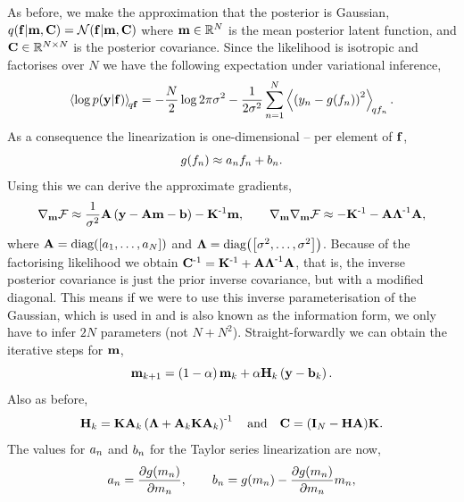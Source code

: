 \documentclass{article} %
\begin{document}
As before, we make the approximation that the posterior is Gaussian,
$\qrobC{\lstate}{\pomean, \pocov} = \gausC{\lstate}{\pomean, \pocov}$ where
$\pomean \in \real{N}$ is the mean posterior latent function, and $\pocov \in
\real{N \times N}$ is the posterior covariance. Since the likelihood is
isotropic and factorises over $N$ we have the following expectation under
variational inference,
\begin{equation*}
    \expec{q\lstate}{\log\probC{\obs}{\lstate}} =
        - \frac{N}{2}\log{2\pi\lvar}
        - \frac{1}{2\lvar} \sum_{n=1}^N 
            \expec{q\lstates_n}{\brac{\obss_n - \nonlin{\lstates_n}}^2}.
\end{equation*}
As a consequence the linearization is one-dimensional -- per element of 
$\lstate$,
\begin{equation}
    \nonlin{\lstates_n} \approx \Lins_n\lstates_n + \intcpts_n.
\end{equation}
Using this we can derive the approximate gradients,
\begin{equation}
    \nabla_\pomean\Fengy \approx \frac{1}{\lvar}\Linmat\brac{\obs -
        \Linmat\pomean - \intcpt} - \KERNL\inv\pomean,
    \qquad
    \nabla_\pomean\nabla_\pomean \Fengy \approx -\KERNL\inv
    -\Linmat\Lvar\inv\Linmat,
\end{equation}
where $\Linmat = \diag{\sbrac{\Lins_1, \ldots, \Lins_N}}$ and $\Lvar =
\diag{\sbrac{\lvar, \ldots, \lvar}}$. Because of the factorising likelihood we
obtain $\pocov\inv = \KERNL\inv + \Linmat\Lvar\inv\Linmat$, that is, the
inverse posterior covariance is just the prior inverse covariance, but with a
modified diagonal. This means if we were to use this inverse parameterisation
of the Gaussian, which is used in \cite{Opper2009} and is also known as the
information form, we only have to infer $2N$ parameters (not $N + N^2$).
Straight-forwardly we can obtain the iterative steps for $\pomean$,
\begin{equation}
    \pomean_{k+1} = \brac{1-\step}\pomean_k 
        + \step\Kgain_k\brac{\obs - \intcpt_k}.
    \label{eq:pomeangp}
\end{equation}
Also as before,
\begin{equation}
    \Kgain_k = \KERNL\Linmat_k\brac{\Lvar + \Linmat_k\KERNL\Linmat_k}\inv
    \quad \text{and} \quad
    \pocov = \brac{\ident{N} - \Kgain\Linmat}\!\KERNL.
    \label{eq:pocovgp}
\end{equation}
The values for $\Lins_n$ and $\intcpts_n$ for the Taylor series linearization
are now,
\begin{equation}
    \Lins_n = \frac{\partial\nonlin{\pomeans_n}}{\partial\pomeans_n},
    \qquad
    \intcpts_n = \nonlin{\pomeans_n}
        - \frac{\partial\nonlin{\pomeans_n}}{\partial\pomeans_n} \pomeans_n,
\end{equation}
\end{document}
